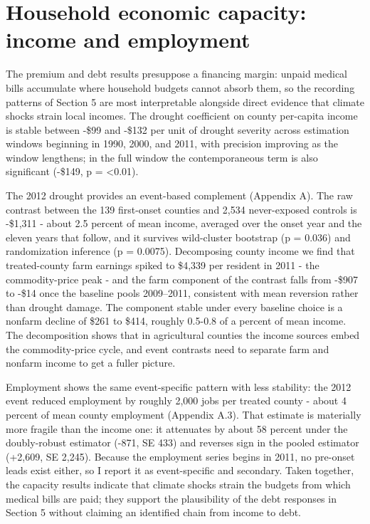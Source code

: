 \documentclass[a4paper,11pt]{article}
\begin{document}
\FloatBarrier
\section{Household economic capacity: income and employment}

The premium and debt results presuppose a financing margin: unpaid medical bills accumulate where household budgets cannot absorb them, so the recording patterns of Section 5 are most interpretable alongside direct evidence that climate shocks strain local incomes. The drought coefficient on county per-capita income is stable between -\$99 and -\$132 per unit of drought severity across estimation windows beginning in 1990, 2000, and 2011, with precision improving as the window lengthens; in the full window the contemporaneous term is also significant (-\$149, p = <0.01).

The 2012 drought provides an event-based complement (Appendix A). The raw contrast between the 139 first-onset counties and 2,534 never-exposed controls is -\$1,311 - about 2.5 percent of mean income, averaged over the onset year and the eleven years that follow, and it survives wild-cluster bootstrap (p = 0.036) and randomization inference (p = 0.0075). Decomposing county income we find that treated-county farm earnings spiked to \$4,339 per resident in 2011 - the commodity-price peak - and the farm component of the contrast falls from -\$907 to -\$14 once the baseline pools 2009--2011, consistent with mean reversion rather than drought damage. The component stable under every baseline choice is a nonfarm decline of \$261 to \$414, roughly 0.5-0.8 of a percent of mean income. The decomposition shows that in agricultural counties the income sources embed the commodity-price cycle, and event contrasts need to separate farm and nonfarm income to get a fuller picture.

Employment shows the same event-specific pattern with less stability: the 2012 event reduced employment by roughly 2,000 jobs per treated county - about 4 percent of mean county employment (Appendix A.3). That estimate is materially more fragile than the income one: it attenuates by about 58 percent under the doubly-robust estimator (-871, SE 433) and reverses sign in the pooled estimator (+2,609, SE 2,245). Because the employment series begins in 2011, no pre-onset leads exist either, so I report it as event-specific and secondary. Taken together, the capacity results indicate that climate shocks strain the budgets from which medical bills are paid; they support the plausibility of the debt responses in Section 5 without claiming an identified chain from income to debt.
\end{document}
